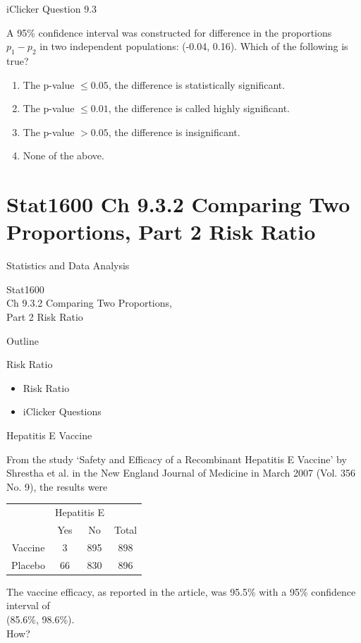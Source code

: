 \documentclass[14pt]{beamer}\usepackage[]{graphicx}\usepackage[]{color}
\begin{document}
\begin{frame}[fragile]{iClicker Question 9.3}

A 95\% confidence interval was constructed for difference in the proportions $p_1 - p_2$ in two independent populations: (-0.04, 0.16). Which of the following is true?

\begin{enumerate}
\item The p-value $\le 0.05$, the difference is statistically significant.
\item The p-value $\le 0.01$, the difference is called highly significant.
\item The p-value $> 0.05$, the difference is insignificant.
\item None of the above.
\end{enumerate}
\end{frame}



\section{Stat1600 Ch 9.3.2 Comparing Two  Proportions, Part 2 Risk Ratio}

\begin{frame}[fragile]{Statistics and Data Analysis}

Stat1600 \\ Ch 9.3.2 Comparing Two  Proportions, \\ Part 2 Risk Ratio

\end{frame}

\begin{frame}[fragile]{Outline}

Risk Ratio  

\begin{itemize}
\item Risk Ratio
\item iClicker Questions
\end{itemize}

\end{frame}

\begin{frame}[fragile]{Hepatitis E Vaccine}

From the study `Safety and Efficacy of a Recombinant Hepatitis E  Vaccine' by Shrestha et al. in the New England Journal of Medicine in  March 2007 (Vol. 356 No. 9), the results were

\begin{tabular}{@{} cccc @{}} \hline
     & \multicolumn{2}{c}{Hepatitis E} \\
     & Yes & No & Total \\ \hline
Vaccine & 3 & 895 & 898 \\
Placebo & 66 & 830 & 896 \\ \hline
\end{tabular}

The vaccine efficacy, as reported in the article, was 95.5\% with a 95\%  confidence interval of \\ (85.6\%, 98.6\%). \\
How?

\end{frame}
\end{document}
